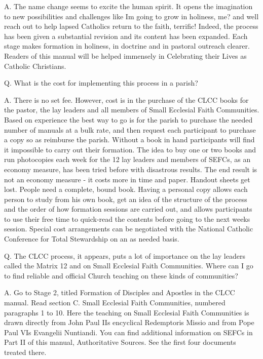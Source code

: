 \documentclass[oneside]{book}
\begin{document}
A. The name change seems to excite the human spirit. It opens the imagination to
new possibilities and challenges like Im going to grow in holiness, me? and well
reach out to help lapsed Catholics return to the faith, terrific! Indeed, the
process has been given a substantial revision and its content has been
expanded. Each stage makes formation in holiness, in doctrine and in pastoral
outreach clearer. Readers of this manual will be helped immensely in Celebrating
their Lives as Catholic Christians.



Q. What is the cost for implementing this process in a parish?

A. There is no set fee. However, cost is in the purchase of the CLCC books for
the pastor, the lay leaders and all members of Small Ecclesial Faith
Communities. Based on experience the best way to go is for the parish to
purchase the needed number of manuals at a bulk rate, and then request each
participant to purchase a copy so as reimburse the parish. Without a book in
hand participants will find it impossible to carry out their formation. The idea
to buy one or two books and run photocopies each week for the 12 lay leaders and
members of SEFCs, as an economy measure, has been tried before with disastrous
results. The end result is not an economy measure - it costs more in time and
paper. Handout sheets get lost. People need a complete, bound book.  Having a
personal copy allows each person to study from his own book, get an idea of the
structure of the process and the order of how formation sessions are carried
out, and allows participants to use their free time to quick-read the contents
before going to the next weeks session.  Special cost arrangements can be
negotiated with the National Catholic Conference for Total Stewardship on an as
needed basis.


Q. The CLCC process, it appears, puts a lot of importance on the lay leaders
called the Matrix 12 and on Small Ecclesial Faith Communities. Where can I go to
find reliable and official Church teaching on these kinds of communities?

A. Go to Stage 2, titled Formation of Disciples and Apostles in the CLCC
manual. Read section C. Small Ecclesial Faith Communities, numbered paragraphs 1
to 10. Here the teaching on Small Ecclesial Faith Communities is drawn directly
from John Paul IIs encyclical Redemptoris Missio and from Pope Paul VIs
Evangelii Nuntiandi. You can find additional information on SEFCs in Part II of
this manual, Authoritative Sources. See the first four documents treated there.
\end{document}
